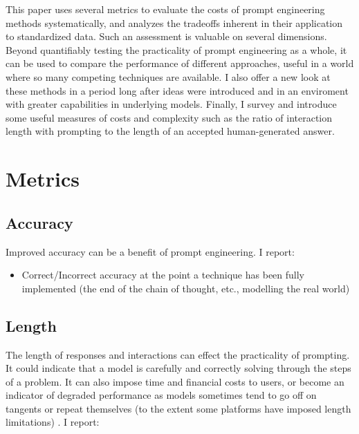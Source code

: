 \documentclass[11pt]{article}
\begin{document}
This paper uses several metrics to evaluate the costs of prompt engineering methods systematically, and analyzes the tradeoffs inherent in their application to standardized data. Such an assessment is valuable on several dimensions. Beyond quantifiably testing the practicality of prompt engineering as a whole, it can be used to compare the performance of different approaches, useful in a world where so many competing techniques are available. I also offer a new look at these methods in a period long after ideas were introduced and in an enviroment with greater capabilities in underlying models. Finally, I survey and introduce some useful measures of costs and complexity such as the ratio of interaction length with prompting to the length of an accepted human-generated answer.

\section*{Metrics}

\subsection*{Accuracy}

Improved accuracy can be a benefit of prompt engineering. I report:

\begin{itemize}
  \item Correct/Incorrect accuracy at the point a technique has been fully implemented (the end of the chain of thought, etc., modelling the real world)
\end{itemize}

\subsection*{Length}

The length of responses and interactions can effect the practicality of prompting. It could indicate that a model is carefully and correctly solving through the steps of a problem. It can also impose time and financial costs to users, or become an indicator of degraded performance as models sometimes tend to go off on tangents or repeat themselves (to the extent some platforms have imposed length limitations) \cite{mann_microsoft_nodate}. I report:
\end{document}
